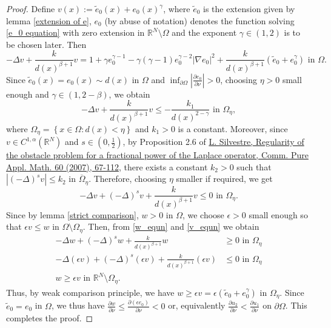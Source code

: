 \documentclass[10pt,a4paper]{amsart}
\newcommand{\De}{\Delta}
\newcommand{\Om}{\Omega}
\newcommand{\ba}{\beta}
\newcommand{\pa}{\partial}
\newcommand{\sr}{\mathbb{R}}
\newcommand{\na}{\nabla}
\newcommand{\et}{\tilde{e}_0}
\begin{document}
\begin{proof}
    Define $v(x):= \et (x) + e_0 (x)^{\gamma}$, where $\et$ is the extension given by lemma \ref{extension of e}, $e_0$ (by abuse of notation) denotes the function solving \eqref{e_0 equation} with zero extension in $\sr^N \setminus \Om$ and the exponent $\gamma\in (1,2)$ is to be chosen later. Then
    \begin{equation}\label{direct computation}
        -\Delta v + \frac{k}{d(x)^{\ba +1}} v = 1 + \gamma e_0^{\gamma -1} -\gamma (\gamma -1) e_0^{\gamma -2} |\na e_0|^2 + \frac{k}{d(x)^{\ba +1}} \left(\et + e_0^{\gamma}\right) \text{ in } \Om.
    \end{equation}
    Since $\et (x) = e_0 (x) \sim d(x)$ in $\Om$ and $\inf_{\pa\Om} \left| \frac{\pa e_0}{\pa\nu} \right| >0$, choosing $\eta>0$ small enough and $\gamma \in (1, 2- \ba)$, we obtain
    \begin{equation}\label{est_k1}
        -\Delta v + \frac{k}{d(x)^{\ba +1}} v \leq - \frac{k_1}{d(x)^{2-\gamma}} \text{ in } \Om_{\eta},
    \end{equation}
    where $\Om_{\eta} = \left\{ x\in \Om : d(x) < \eta \right\}$ and $k_1 >0$ is a constant. Moreover, since $v \in C^{1,\alpha} (\sr^N)$ and $s\in \left(0, \frac{1}{2}\right)$, by Proposition 2.6 of \href{https://doi.org/10.1002/cpa.20153}{L. Silvestre, Regularity of the obstacle problem for a fractional power of the Laplace operator, Comm. Pure Appl. Math. 60 (2007), 67-112}, there exists a constant $k_2 >0$ such that $\left|(-\De)^s v\right| \leq k_2$ in $\overline{\Om}_{\eta}$. Therefore, choosing $\eta$ smaller if required, we get
    \begin{equation}\label{v_equn}
        -\Delta v + (-\De)^s v + \frac{k}{d(x)^{\ba +1}} v \leq 0 \text{ in } \Om_{\eta}.
    \end{equation}
    Since by lemma \ref{strict comparison}, $w >0$ in $\Om$, we choose $\epsilon>0$ small enough so that $\epsilon v \leq w$ in $\Om \setminus \Om_{\eta}$. Then, from \eqref{w_equn} and \eqref{v_equn} we obtain
    \begin{equation}
        \begin{aligned}
            -\Delta w + (-\De)^s w + \frac{k}{d(x)^{\ba +1}} w &\geq 0 \text{ in } \Om_{\eta}\\
            -\Delta (\epsilon v) + (-\De)^s (\epsilon v) + \frac{k}{d(x)^{\ba +1}} (\epsilon v) &\leq 0 \text{ in } \Om_{\eta}\\
            w \geq \epsilon v \text{ in } \sr^N \setminus \Om_{\eta}.
        \end{aligned}
    \end{equation}
    Thus, by weak comparison principle, we have $w \geq \epsilon v = \epsilon \left(\et + e_0^{\gamma}\right)$ in $\Om_{\eta}$. Since $\et = e_0$ in $\Om$, we thus have $\frac{\pa w}{\pa\nu} \leq \frac{\pa \left(\epsilon e_0\right)}{\pa\nu} < 0$ or, equivalently $\frac{\pa u_2}{\pa\nu} < \frac{\pa u_1}{\pa\nu}$ on $\pa\Om$. This completes the proof.
\end{proof}
\end{document}
